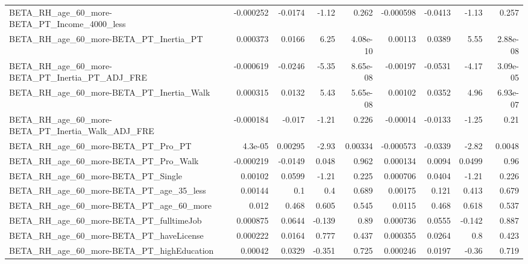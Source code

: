 \begin{tabular}{lrrrrrrrr}
BETA\_RH\_age\_60\_more-BETA\_PT\_Income\_4000\_less       &   -0.000252 &      -0.0174 &    -1.12 &    0.262 &  -0.000598 &     -0.0413 &        -1.13 &         0.257 \\
BETA\_RH\_age\_60\_more-BETA\_PT\_Inertia\_PT             &    0.000373 &       0.0166 &     6.25 & 4.08e-10 &    0.00113 &      0.0389 &         5.55 &      2.88e-08 \\
BETA\_RH\_age\_60\_more-BETA\_PT\_Inertia\_PT\_ADJ\_FRE     &   -0.000619 &      -0.0246 &    -5.35 & 8.65e-08 &   -0.00197 &     -0.0531 &        -4.17 &      3.09e-05 \\
BETA\_RH\_age\_60\_more-BETA\_PT\_Inertia\_Walk           &    0.000315 &       0.0132 &     5.43 & 5.65e-08 &    0.00102 &      0.0352 &         4.96 &      6.93e-07 \\
BETA\_RH\_age\_60\_more-BETA\_PT\_Inertia\_Walk\_ADJ\_FRE   &   -0.000184 &       -0.017 &    -1.21 &    0.226 &   -0.00014 &     -0.0133 &        -1.25 &          0.21 \\
BETA\_RH\_age\_60\_more-BETA\_PT\_Pro\_PT                 &     4.3e-05 &      0.00295 &    -2.93 &  0.00334 &  -0.000573 &     -0.0339 &        -2.82 &        0.0048 \\
BETA\_RH\_age\_60\_more-BETA\_PT\_Pro\_Walk               &   -0.000219 &      -0.0149 &    0.048 &    0.962 &   0.000134 &      0.0094 &       0.0499 &          0.96 \\
BETA\_RH\_age\_60\_more-BETA\_PT\_Single                 &     0.00102 &       0.0599 &    -1.21 &    0.225 &   0.000706 &      0.0404 &        -1.21 &         0.226 \\
BETA\_RH\_age\_60\_more-BETA\_PT\_age\_35\_less            &     0.00144 &          0.1 &      0.4 &    0.689 &    0.00175 &       0.121 &        0.413 &         0.679 \\
BETA\_RH\_age\_60\_more-BETA\_PT\_age\_60\_more            &       0.012 &        0.468 &    0.605 &    0.545 &     0.0115 &       0.468 &        0.618 &         0.537 \\
BETA\_RH\_age\_60\_more-BETA\_PT\_fulltimeJob            &    0.000875 &       0.0644 &   -0.139 &     0.89 &   0.000736 &      0.0555 &       -0.142 &         0.887 \\
BETA\_RH\_age\_60\_more-BETA\_PT\_haveLicense            &    0.000222 &       0.0164 &    0.777 &    0.437 &   0.000355 &      0.0264 &          0.8 &         0.423 \\
BETA\_RH\_age\_60\_more-BETA\_PT\_highEducation          &     0.00042 &       0.0329 &   -0.351 &    0.725 &   0.000246 &      0.0197 &        -0.36 &         0.719 \\

\end{tabular}
